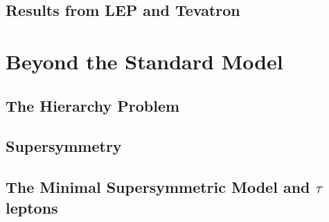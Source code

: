 \subsection{Results from LEP and Tevatron}

\section{Beyond the Standard Model}
\label{sec:BSM}
\subsection{The Hierarchy Problem}
\subsection{Supersymmetry}
\subsection{The Minimal Supersymmetric Model and $\tau$ leptons}
\label{sec:MSSMAndTaus}

